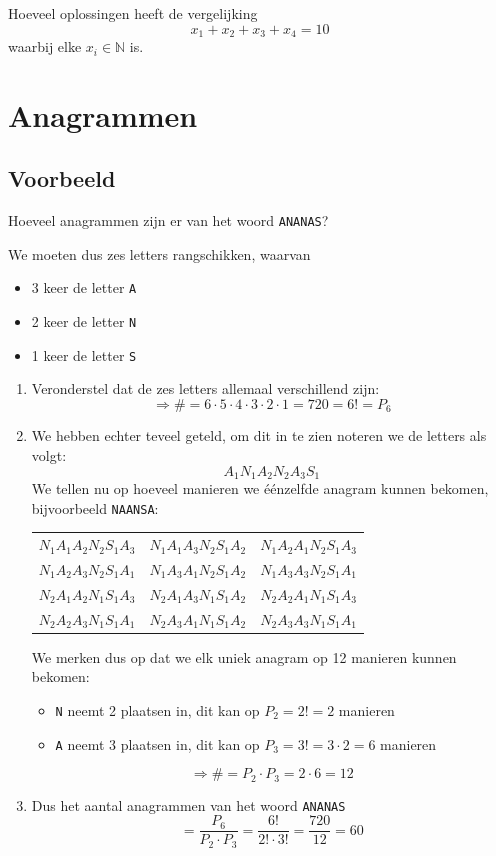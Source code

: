 \documentclass[12pt,a4,twoside]{article}
\begin{document}
\begin{oefening} %
Hoeveel oplossingen heeft de vergelijking
$$x_1 + x_2 + x_3 + x_4 = 10$$
waarbij elke $x_i\in\mathbb{N}$ is.
\end{oefening}

\pagebreak
\section{Anagrammen}



\subsection{Voorbeeld}

Hoeveel anagrammen zijn er van het woord \verb#ANANAS#?

We moeten dus zes letters rangschikken, waarvan
\begin{itemize}
  \item 3 keer de letter \verb#A#
  \item 2 keer de letter \verb#N#
  \item 1 keer de letter \verb#S#
\end{itemize}

\begin{enumerate}
  \item Veronderstel dat de zes letters allemaal verschillend zijn:\\
  $$\Rightarrow \#=6\cdot5\cdot4\cdot3\cdot2\cdot1=720=6!=P_6$$
  \item We hebben echter teveel geteld, om dit in te zien noteren we de letters als volgt:
  $$A_1N_1A_2N_2A_3S_1$$
  We tellen nu op hoeveel manieren we éénzelfde anagram kunnen bekomen, bijvoorbeeld \verb#NAANSA#:
  \begin{center}
  \begin{tabular}{ccc}
    $N_1A_1A_2N_2S_1A_3$ & $N_1A_1A_3N_2S_1A_2$ & $N_1A_2A_1N_2S_1A_3$\\
    $N_1A_2A_3N_2S_1A_1$ & $N_1A_3A_1N_2S_1A_2$ & $N_1A_3A_3N_2S_1A_1$\\
    $N_2A_1A_2N_1S_1A_3$ & $N_2A_1A_3N_1S_1A_2$ & $N_2A_2A_1N_1S_1A_3$\\
    $N_2A_2A_3N_1S_1A_1$ & $N_2A_3A_1N_1S_1A_2$ & $N_2A_3A_3N_1S_1A_1$\\
  \end{tabular}
  \end{center}
  We merken dus op dat we elk uniek anagram op 12 manieren kunnen bekomen:
  \begin{itemize}
    \item \verb#N# neemt 2 plaatsen in, dit kan op $P_2=2!=2$ manieren
    \item \verb#A# neemt 3 plaatsen in, dit kan op $P_3=3!=3\cdot2=6$ manieren
  \end{itemize}
  $$\Rightarrow \#=P_2\cdot P_3=2\cdot6=12$$
  \item Dus het aantal anagrammen van het woord \verb#ANANAS#
  $$=\dfrac{P_6}{P_2\cdot P_3}=\dfrac{6!}{2!\cdot 3!}=\dfrac{720}{12}=60$$
\end{enumerate}
\end{document}
